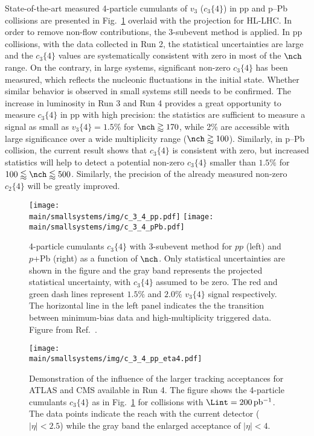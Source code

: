 \documentclass[../report.tex]{subfiles}
\providecommand{\main}{..}
\begin{document}
State-of-the-art measured 4-particle cumulants of $v_3$ ($c_3\{4\}$) in pp and p--Pb collisions are presented in Fig.~\ref{fig:smallsystems_corr_cumulants} overlaid with the projection for HL-LHC. 
In order to remove non-flow contributions, the 3-subevent method is applied. In pp collisions, with the data collected in Run 2, the statistical uncertainties are large and the $c_3\{4\}$ values are systematically consistent with zero in most of the $\nch$ range. On the contrary, in large systems, significant non-zero $c_3\{4\}$ has been measured, which reflects the nucleonic fluctuations in the initial state. Whether similar behavior is observed in small systems still needs to be confirmed. The increase in luminosity in Run 3 and Run 4 provides a great opportunity to measure $c_3\{4\}$ in pp with high precision: the statistics are sufficient to measure a signal as small as $v_3\{4\} = 1.5\%$ for $\nch \gtrapprox 170$, while 2\% are accessible with large significance over a wide multiplicity range ($\nch \gtrapprox 100$). Similarly, in p--Pb collision, the current result shows that $c_3\{4\}$ is consistent with zero, but increased statistics will help to detect a potential non-zero $c_3\{4\}$ smaller than $1.5\%$ for $100 \lessapprox \nch \lessapprox 500$. Similarly, the precision of the already measured non-zero $c_2\{4\}$ will be greatly improved.

\begin{figure}[ht]
\centering
\texttt{[image: \\main/smallsystems/img/c\_3\_4\_pp.pdf]}
\hfill
\texttt{[image: \\main/smallsystems/img/c\_3\_4\_pPb.pdf]}
\caption{4-particle cumulants $c_3\{4\}$ with 3-subevent method for $pp$ (left) and $p$+Pb (right) as a function of $\nch$. Only statistical uncertainties are shown in the figure and the gray band represents the projected statistical uncertainty, with $c_3\{4\}$ assumed to be zero. The red and green dash lines represent $1.5\%$ and $2.0\%$ $v_3\{4\}$ signal respectively. The horizontal line in the left panel indicates the the transition between minimum-bias data and high-multiplicity triggered data. Figure from Ref.~\cite{}.}
\label{fig:smallsystems_corr_cumulants}
\end{figure}

\begin{figure}[ht]
\centering
\texttt{[image: \\main/smallsystems/img/c\_3\_4\_pp\_eta4.pdf]}
\caption{Demonstration of the influence of the larger tracking acceptances for ATLAS and CMS available in Run 4. The figure shows the 4-particle cumulants $c_3\{4\}$ as in Fig.~\ref{fig:smallsystems_corr_cumulants} for \pp{} collisions with $\Lint = \unit[200]{pb^{-1}}$. The data points indicate the reach with the current detector ($|\eta| < 2.5$) while the gray band the enlarged acceptance of $|\eta| < 4$.}
\label{fig:smallsystems_corr_cumulants_eta4}
\end{figure}
\end{document}
